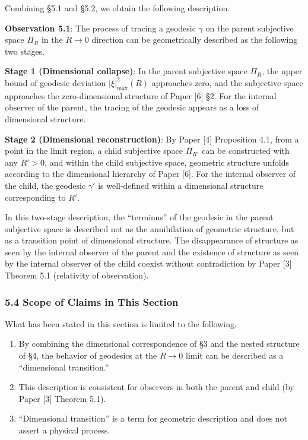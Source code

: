 \documentclass[a4paper,11pt]{article}
\theoremstyle{definition}
\providecommand{\tightlist}{\setlength{\itemsep}{0pt}\setlength{\parskip}{0pt}}
\begin{document}
Combining §5.1 and §5.2, we obtain the following description.

\textbf{Observation 5.1}: The process of tracing a geodesic \(\gamma\)
on the parent subjective space \(\Pi_R\) in the \(R \to 0\) direction
can be geometrically described as the following two stages.

\textbf{Stage 1 (Dimensional collapse)}: In the parent subjective space
\(\Pi_R\), the upper bound of geodesic deviation \(|\xi|^2_{\max}(R)\)
approaches zero, and the subjective space approaches the
zero-dimensional structure of Paper {[}6{]} §2. For the internal
observer of the parent, the tracing of the geodesic appears as a loss of
dimensional structure.

\textbf{Stage 2 (Dimensional reconstruction)}: By Paper {[}4{]}
Proposition 4.1, from a point in the limit region, a child subjective
space \(\Pi_{R'}\) can be constructed with any \(R' > 0\), and within
the child subjective space, geometric structure unfolds according to the
dimensional hierarchy of Paper {[}6{]}. For the internal observer of the
child, the geodesic \(\gamma'\) is well-defined within a dimensional
structure corresponding to \(R'\).

In this two-stage description, the ``terminus'' of the geodesic in the
parent subjective space is described not as the annihilation of
geometric structure, but as a transition point of dimensional structure.
The disappearance of structure as seen by the internal observer of the
parent and the existence of structure as seen by the internal observer
of the child coexist without contradiction by Paper {[}3{]} Theorem 5.1
(relativity of observation).

\subsubsection{5.4 Scope of Claims in This
Section}\label{scope-of-claims-in-this-section-1}

What has been stated in this section is limited to the following.

\begin{enumerate}
\def\labelenumi{\arabic{enumi}.}
\tightlist
\item
  By combining the dimensional correspondence of §3 and the nested
  structure of §4, the behavior of geodesics at the \(R \to 0\) limit
  can be described as a ``dimensional transition.''
\item
  This description is consistent for observers in both the parent and
  child (by Paper {[}3{]} Theorem 5.1).
\item
  ``Dimensional transition'' is a term for geometric description and
  does not assert a physical process.
\end{enumerate}
\end{document}
